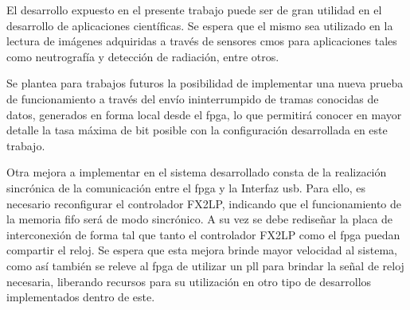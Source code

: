 El desarrollo expuesto en el presente trabajo puede ser de gran utilidad en el desarrollo de aplicaciones científicas. Se espera que el mismo sea utilizado en la lectura de imágenes adquiridas a través de sensores \acrshort{cmos} para aplicaciones tales como neutrografía y detección de radiación, entre otros.

Se plantea para trabajos futuros la posibilidad de implementar una nueva prueba de funcionamiento a través del envío ininterrumpido de tramas conocidas de datos, generados en forma local desde el \acrshort{fpga}, lo que permitirá conocer en mayor detalle la tasa máxima de bit posible con la configuración desarrollada en este trabajo.

Otra mejora a implementar en el sistema desarrollado consta de la realización sincrónica de la comunicación entre el \acrshort{fpga} y la Interfaz \acrshort{usb}. Para ello, es necesario reconfigurar el controlador FX2LP, indicando que el funcionamiento de la memoria \acrshort{fifo} será de modo sincrónico. A su vez se debe rediseñar la placa de interconexión de forma tal que tanto el controlador FX2LP como el \acrshort{fpga} puedan compartir el reloj. Se espera que esta mejora brinde mayor velocidad al sistema, como así también se releve al \acrshort{fpga} de utilizar un \acrshort{pll} para brindar la señal de reloj necesaria, liberando recursos para su utilización en otro tipo de desarrollos implementados dentro de este.